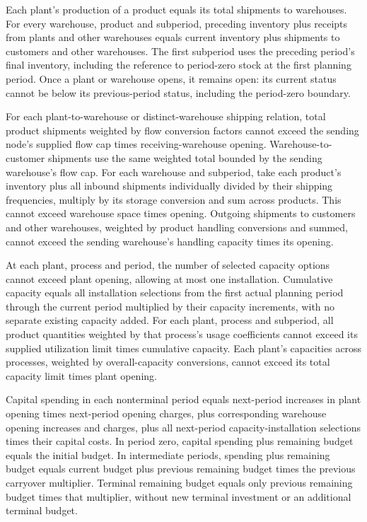 \documentclass[10pt]{article}
\begin{document}
Each plant's production of a product equals its total shipments to warehouses. For every warehouse, product and subperiod, preceding inventory plus receipts from plants and other warehouses equals current inventory plus shipments to customers and other warehouses. The first subperiod uses the preceding period's final inventory, including the reference to period-zero stock at the first planning period. Once a plant or warehouse opens, it remains open: its current status cannot be below its previous-period status, including the period-zero boundary.

For each plant-to-warehouse or distinct-warehouse shipping relation, total product shipments weighted by flow conversion factors cannot exceed the sending node's supplied flow cap times receiving-warehouse opening. Warehouse-to-customer shipments use the same weighted total bounded by the sending warehouse's flow cap. For each warehouse and subperiod, take each product's inventory plus all inbound shipments individually divided by their shipping frequencies, multiply by its storage conversion and sum across products. This cannot exceed warehouse space times opening. Outgoing shipments to customers and other warehouses, weighted by product handling conversions and summed, cannot exceed the sending warehouse's handling capacity times its opening.

At each plant, process and period, the number of selected capacity options cannot exceed plant opening, allowing at most one installation. Cumulative capacity equals all installation selections from the first actual planning period through the current period multiplied by their capacity increments, with no separate existing capacity added. For each plant, process and subperiod, all product quantities weighted by that process's usage coefficients cannot exceed its supplied utilization limit times cumulative capacity. Each plant's capacities across processes, weighted by overall-capacity conversions, cannot exceed its total capacity limit times plant opening.

Capital spending in each nonterminal period equals next-period increases in plant opening times next-period opening charges, plus corresponding warehouse opening increases and charges, plus all next-period capacity-installation selections times their capital costs. In period zero, capital spending plus remaining budget equals the initial budget. In intermediate periods, spending plus remaining budget equals current budget plus previous remaining budget times the previous carryover multiplier. Terminal remaining budget equals only previous remaining budget times that multiplier, without new terminal investment or an additional terminal budget.
\end{document}
